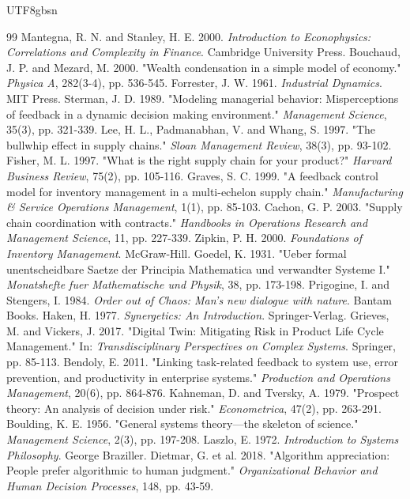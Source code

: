 \documentclass[11pt,a4paper]{article}
\begin{document}
\begin{CJK*}{UTF8}{gbsn}
\begin{thebibliography}{99}
 Mantegna, R. N. and Stanley, H. E. 2000. \textit{Introduction to Econophysics: Correlations and Complexity in Finance}. Cambridge University Press.
 Bouchaud, J. P. and Mezard, M. 2000. "Wealth condensation in a simple model of economy." \textit{Physica A}, 282(3-4), pp. 536-545.
 Forrester, J. W. 1961. \textit{Industrial Dynamics}. MIT Press.
 Sterman, J. D. 1989. "Modeling managerial behavior: Misperceptions of feedback in a dynamic decision making environment." \textit{Management Science}, 35(3), pp. 321-339.
 Lee, H. L., Padmanabhan, V. and Whang, S. 1997. "The bullwhip effect in supply chains." \textit{Sloan Management Review}, 38(3), pp. 93-102.
 Fisher, M. L. 1997. "What is the right supply chain for your product?" \textit{Harvard Business Review}, 75(2), pp. 105-116.
 Graves, S. C. 1999. "A feedback control model for inventory management in a multi-echelon supply chain." \textit{Manufacturing \& Service Operations Management}, 1(1), pp. 85-103.
 Cachon, G. P. 2003. "Supply chain coordination with contracts." \textit{Handbooks in Operations Research and Management Science}, 11, pp. 227-339.
 Zipkin, P. H. 2000. \textit{Foundations of Inventory Management}. McGraw-Hill.
 Goedel, K. 1931. "Ueber formal unentscheidbare Saetze der Principia Mathematica und verwandter Systeme I." \textit{Monatshefte fuer Mathematische und Physik}, 38, pp. 173-198.
 Prigogine, I. and Stengers, I. 1984. \textit{Order out of Chaos: Man's new dialogue with nature}. Bantam Books.
 Haken, H. 1977. \textit{Synergetics: An Introduction}. Springer-Verlag.
 Grieves, M. and Vickers, J. 2017. "Digital Twin: Mitigating Risk in Product Life Cycle Management." In: \textit{Transdisciplinary Perspectives on Complex Systems}. Springer, pp. 85-113.
 Bendoly, E. 2011. "Linking task-related feedback to system use, error prevention, and productivity in enterprise systems." \textit{Production and Operations Management}, 20(6), pp. 864-876.
 Kahneman, D. and Tversky, A. 1979. "Prospect theory: An analysis of decision under risk." \textit{Econometrica}, 47(2), pp. 263-291.
 Boulding, K. E. 1956. "General systems theory—the skeleton of science." \textit{Management Science}, 2(3), pp. 197-208.
 Laszlo, E. 1972. \textit{Introduction to Systems Philosophy}. George Braziller.
 Dietmar, G. et al. 2018. "Algorithm appreciation: People prefer algorithmic to human judgment." \textit{Organizational Behavior and Human Decision Processes}, 148, pp. 43-59.
\end{thebibliography}

\end{CJK*}
\end{document}
